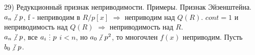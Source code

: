 29) Редукционный признак неприводимости. Примеры. Признак Эйзенштейна.\\
$a_n \ndi p$, f - неприводим в $R/p[x]$ $\Rightarrow$ неприводим над $Q(R)$. $cont = 1$ и неприводимость над $Q(R)$ $\Rightarrow$ неприводимость над $R$. \\ 
$a_n \ndi p$, все $a_i \di p$ $i<n$, но $a_0\ndi p^2$, то многочлен $f(x)$ неприводим. Пусть $b_0 \ndi p$.\\

